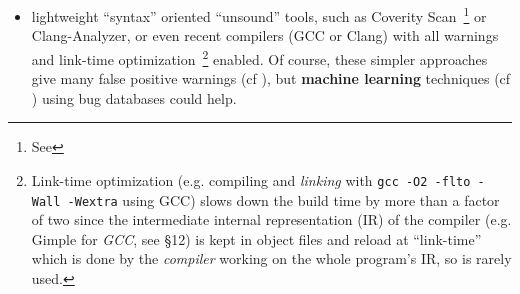 \begin{itemize}
    lines of C code (following some \emph{particular} coding style or
    using some definable \emph{subset} of the C language\footnote{For
      instance, both \emph{Frama-C} and \emph{Astrée} have issues in
      dealing with standard dynamic C memory allocation above
      \texttt{malloc}; since they target above all the safety critical
      real-time embedded software market where such allocations are
      \emph{forbidden}.}). Some formal analysis approaches include a
    definition of a strict subset of \emph{C}, thru perhaps some
    automatically generated code (cf. \cite{Bhargavan:DFHPRR17}) from
    some DSL.  In practice, the formal sound static analyzers are able
    to prove \emph{automatically} some \emph{simple} properties of
    small, highly critical, software components (e.g. avoiding the
    need of \emph{unit testing} at the expense of very \emph{costly
      software development efforts}).

  \item lightweight ``syntax'' oriented ``unsound'' tools, such as
    Coverity Scan~\footnote{See } or
    Clang-Analyzer, or even recent compilers (GCC or Clang) with all
    warnings and link-time optimization~\footnote{Link-time
      optimization (e.g. compiling and \emph{linking} with \texttt{gcc
        -O2 -flto -Wall -Wextra} using GCC) slows down the build time by more than a
      factor of two since the intermediate internal representation (IR) of the
      compiler (e.g. Gimple  for \emph{GCC}, see \cite{gcc-internals} \S{12}) is kept in object files and
      reload at ``link-time'' which is done by the \emph{compiler}
      working on the whole program's IR, so is rarely used.}  enabled. Of
    course, these simpler approaches give many false positive warnings
    (cf \cite{Nadeem:2012:HFP}), but \textbf{machine learning} techniques (cf
    \cite{Perl:2015:VFP, flach:2012:machine-learning, shalev:2014:understanding-machine-learning}) using bug databases could help.
    
\end{itemize}

